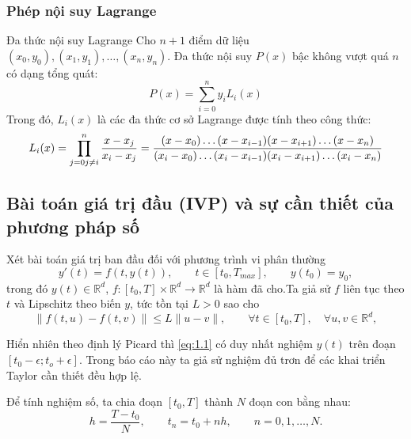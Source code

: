 \subsubsection{Phép nội suy Lagrange}
\begin{baitapbox}{Đa thức nội suy Lagrange}
    Cho $n+1$ điểm dữ liệu $(x_0, y_0), (x_1, y_1), \dots, (x_n, y_n)$. Đa thức nội suy $P(x)$ bậc không vượt quá $n$ có dạng tổng quát:
\[
P(x) = \sum_{i=0}^{n} y_i L_i(x)
\]
Trong đó, $L_i(x)$ là các đa thức cơ sở Lagrange được tính theo công thức:
\[
L_i(x) = \prod_{j=0\\ j \neq i}^{n} \frac{x - x_j}{x_i - x_j} = \frac{(x-x_0)\dots(x-x_{i-1})(x-x_{i+1})\dots(x-x_n)}{(x_i-x_0)\dots(x_i-x_{i-1})(x_i-x_{i+1})\dots(x_i-x_n)}
\]
\end{baitapbox}

\subsection{Bài toán giá trị đầu (IVP) và sự cần thiết của phương pháp số}

Xét bài toán giá trị ban đầu đối với phương trình vi phân thường
\begin{equation}
    y'(t) = f(t, y(t)), \qquad t \in [t_0, T_{max}], \qquad y(t_0) = y_0, \tag{1.1} \label{eq:1.1}
\end{equation}
\noindent trong đó $y(t) \in \mathbb{R}^d$, $f : [t_0, T] \times \mathbb{R}^d \to \mathbb{R}^d$ là hàm đã cho.Ta giả sử $f$ liên tục theo $t$ và Lipschitz theo biến $y$, tức tồn tại $L > 0$ sao cho
        \[
        \|f(t, u) - f(t, v)\| \le L\|u - v\|, \qquad \forall t \in [t_0, T], \quad \forall u, v \in \mathbb{R}^d,
        \]

Hiển nhiên theo định lý Picard thì \eqref{eq:1.1} có duy nhất nghiệm $y(t)$ trên đoạn $[t_0 - \epsilon;t_o + \epsilon]$. Trong báo cáo này ta giả sử nghiệm đủ trơn để các khai triển Taylor cần thiết đều hợp lệ.

Để tính nghiệm số, ta chia đoạn $[t_0, T]$ thành $N$ đoạn con bằng nhau:
\[
    h = \frac{T - t_0}{N}, \qquad t_n = t_0 + nh, \qquad n = 0, 1, \dots, N.
\]

